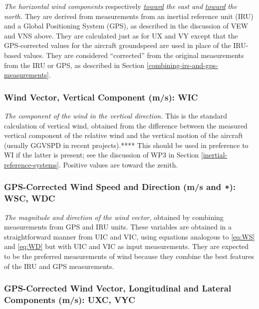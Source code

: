 \documentclass[
]{book}
\begin{document}
\emph{The horizontal wind components} respectively \emph{\uline{toward}} \emph{the east and} \emph{\uline{toward}} \emph{the north.} They are derived from measurements from an inertial reference unit (IRU) and a Global Positioning System (GPS), as described in the discussion of VEW and VNS above. They are calculated just as for UX and VY except that the GPS-corrected values for the aircraft groundspeed are used in place of the IRU-based values. They are considered ``corrected'' from the original measurements from the IRU or GPS, as described in Section \ref{combining-irs-and-gps-measurements}.

\hypertarget{wic}{%
\subsubsection*{Wind Vector, Vertical Component (m/s): WIC}\label{wic}}

\emph{The component of the wind in the vertical direction.} This is the standard calculation of vertical wind, obtained from the difference between the measured vertical component of the relative wind and the vertical motion of the aircraft (usually GGVSPD in recent projects).**** This should be used in preference to WI if the latter is present; see the discussion of WP3 in Section \ref{inertial-reference-systems}. Positive values are toward the zenith.

\hypertarget{wsc-wdc}{%
\subsubsection*{\texorpdfstring{GPS-Corrected Wind Speed and Direction (m/s and {∘}): WSC, WDC}{GPS-Corrected Wind Speed and Direction (m/s and ∘): WSC, WDC}}\label{wsc-wdc}}

\emph{The magnitude and direction of the wind vector,} obtained by combining measurements from GPS and IRU units. These variables are obtained in a straightforward manner from UIC and VIC, using equations analogous to \eqref{eq:WS} and \eqref{eq:WD} but with UIC and VIC as input measurements. They are expected to be the preferred measurements of wind because they combine the best features of the IRU and GPS measurements.

\hypertarget{uxc-vyc}{%
\subsubsection*{GPS-Corrected Wind Vector, Longitudinal and Lateral Components (m/s): UXC, VYC}\label{uxc-vyc}}
\end{document}
